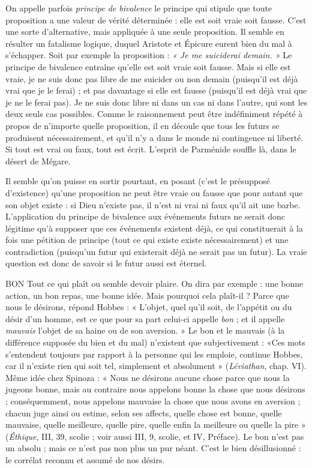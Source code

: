 On appelle parfois {\it principe de bivalence} le principe qui stipule que toute
proposition a une valeur de vérité déterminée : elle est soit vraie soit fausse.
C’est une sorte d’alternative, mais appliquée à une seule proposition. Il semble
en résulter un fatalisme logique, duquel Aristote et Épicure eurent bien du mal
à s'échapper. Soit par exemple la proposition : {\it « Je me suiciderai demain. »} Le
principe de bivalence entraîne qu’elle est soit vraie soit fausse. Mais si elle est
vraie, je ne suis donc pas libre de me suicider ou non demain (puisqu'il est déjà
vrai que je le ferai) ; et pas davantage si elle est fausse (puisqu'il est déjà vrai que
je ne le ferai pas). Je ne suis donc libre ni dans un cas ni dans l’autre, qui sont
les deux seuls cas possibles. Comme le raisonnement peut être indéfiniment
répété à propos de n’importe quelle proposition, il en découle que tous les
futurs se produisent nécessairement, et qu’il n’y a dans le monde ni contingence
ni liberté. Si tout est vrai ou faux, tout est écrit. L'esprit de Parménide
souffle là, dans le désert de Mégare.

Il semble qu’on puisse en sortir pourtant, en posant (c’est le présupposé
d’existence) qu’une proposition ne peut être vraie ou fausse que pour autant
que son objet existe : si Dieu n'existe pas, il n’est ni vrai ni faux qu'il ait une
barbe. L'application du principe de bivalence aux événements futurs ne serait
donc légitime qu’à supposer que ces événements existent déjà, ce qui constituerait
à la fois une pétition de principe (tout ce qui existe existe nécessairement)
et une contradiction (puisqu’un futur qui existerait déjà ne serait pas un futur).
La vraie question est donc de savoir si le futur aussi est éternel.

BON Tout ce qui plaît ou semble devoir plaire. On dira par exemple : une
bonne action, un bon repas, une bonne idée. Mais pourquoi cela plaît-il ?
Parce que nous le désirons, répond Hobbes : « L'objet, quel qu’il soit, de
l'appétit ou du désir d’un homme, est ce que pour sa part celui-ci appelle {\it bon} ;
et il appelle {\it mauvais} l’objet de sa haine ou de son aversion. » Le bon et le mauvais
(à la différence supposée du bien et du mal) n’existent que subjectivement :
«Ces mots s'entendent toujours par rapport à la personne qui les emploie,
continue Hobbes, car il n'existe rien qui soit tel, simplement et absolument »
({\it Léviathan}, chap. VI). Même idée chez Spinoza : « Nous ne désirons aucune
chose parce que nous la jugeons bonne, mais au contraire nous appelons bonne
la chose que nous désirons ; conséquemment, nous appelons mauvaise la chose
que nous avons en aversion ; chacun juge ainsi ou estime, selon ses affects,
quelle chose est bonne, quelle mauvaise, quelle meilleure, quelle pire, quelle
enfin la meilleure ou quelle la pire » ({\it Éthique}, III, 39, scolie ; voir aussi III, 9,
scolie, et IV, Préface). Le bon n’est pas un absolu ; mais ce n’est pas non plus
un pur néant. C’est le bien désillusionné : le corrélat reconnu et assumé de nos
désirs.

